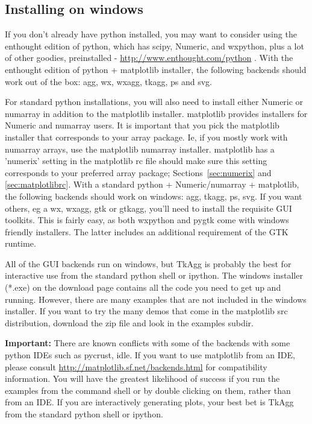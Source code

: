 \documentclass[]{book}
\begin{document}
    
\subsection{Installing on windows}

If you don't already have python installed, you may want to consider
using the enthought edition of python, which has scipy, Numeric, and
wxpython, plus a lot of other goodies, preinstalled -
\url{http://www.enthought.com/python} .  With the enthought edition of
python + matplotlib installer, the following backends should work out
of the box: agg, wx, wxagg, tkagg, ps and svg.

For standard python installations, you will also need to install
either Numeric or numarray in addition to the matplotlib installer.
matplotlib provides installers for Numeric and numarray users.  It is
important that you pick the matplotlib installer that corresponds to
your array package.  Ie, if you mostly work with numarray arrays, use
the matplotlib numarray installer.  matplotlib has a 'numerix' setting
in the matplotlib rc file should make sure this setting corresponds to
your preferred array package; Sections~\ref{sec:numerix} and
\ref{sec:matplotlibrc}. With a standard python + Numeric/numarray +
matplotlib, the following backends should work on windows: agg, tkagg,
ps, svg.  If you want others, eg a wx, wxagg, gtk or gtkagg, you'll
need to install the requisite GUI toolkits.  This is fairly easy, as
both wxpython and pygtk come with windows friendly installers.  The
latter includes an additional requirement of the GTK runtime.

All of the GUI backends run on windows, but TkAgg is probably the best
for interactive use from the standard python shell or ipython.  The
windows installer (*.exe) on the download page contains all the code
you need to get up and running.  However, there are many examples that
are not included in the windows installer.  If you want to try the
many demos that come in the matplotlib src distribution, download the
zip file and look in the examples subdir.

\textbf{Important:} There are known conflicts with some of the
backends with some python IDEs such as pycrust, idle.  If you want to
use matplotlib from an IDE, please consult
\url{http://matplotlib.sf.net/backends.html} for compatibility
information.  You will have the greatest likelihood of success if you
run the examples from the command shell or by double clicking on them,
rather than from an IDE.  If you are interactively generating plots,
your best bet is TkAgg from the standard python shell or ipython.
\end{document}
